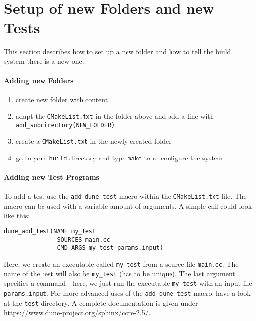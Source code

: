 \section{Setup of new Folders and new Tests}
\label{sc_newfoldersetup}
This section describes how to set up a new folder and how to tell
the build system there is a new one.
\paragraph{Adding new Folders}
\begin{enumerate}[1)]
 \item create new folder with content
 \item adapt the \verb+CMakeList.txt+ in the folder above and add a line with
       \verb+add_subdirectory(NEW_FOLDER)+
 \item create a \verb+CMakeList.txt+ in the newly created folder
 \item go to your \texttt{build}-directory and type \verb+make+ to
       re-configure the system
\end{enumerate}

\paragraph{Adding new Test Programs}
\noindent To add a test use the \texttt{add\_dune\_test} macro within the \texttt{CMakeList.txt} file.
The macro can be used with a variable amount of arguments. A simple call could look like this:

\begin{lstlisting}[style=DumuxCode]
dune_add_test(NAME my_test
               SOURCES main.cc
               CMD_ARGS my_test params.input)
\end{lstlisting}

Here, we create an executable called \texttt{my\_test} from a source file \texttt{main.cc}.
The name of the test will also be \texttt{my\_test} (has to be unique). The last argument specifies a command - here, we just run the executable \texttt{my\_test} with an input file \texttt{params.input}. For more advanced uses of
the \texttt{add\_dune\_test} macro, have a look at the \texttt{test} directory. A complete documentation is given under \url{https://www.dune-project.org/sphinx/core-2.5/}.
